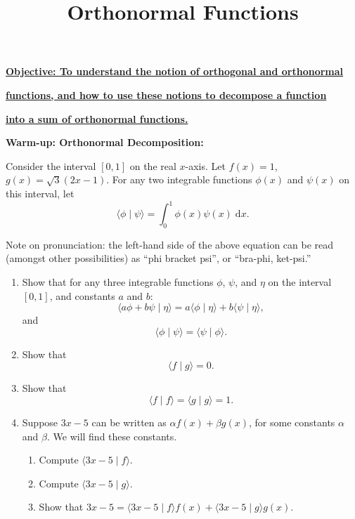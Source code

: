 \documentclass{article}
\newcommand{\diff}{\;\mathrm{d}}
\begin{document}
\title{Orthonormal Functions}
\date{}

\maketitle
\thispagestyle{empty}

\Large

\textbf{\underline{Objective: To understand the notion of orthogonal and orthonormal}}

\textbf{\underline{functions, and how to use these notions to decompose a function}}

\textbf{\underline{into a sum of orthonormal functions.}}






\vspace{5mm}







\textbf{Warm-up: Orthonormal Decomposition:}\bigskip


Consider the interval $[0,1]$ on the real $x$-axis. Let $f(x)=1$, $g(x)=\sqrt{3}(2x-1)$. For any two integrable functions $\phi(x)$ and $\psi(x)$ on this interval, let
\[\langle \phi\mid\psi\rangle = \int_0^1 \phi(x)\psi(x)\diff x.\]

Note on pronunciation: the left-hand side of the above equation can be read (amongst other possibilities) as ``phi bracket psi'', or ``bra-phi, ket-psi.''



\begin{enumerate}
	\item Show that for any three integrable functions $\phi$, $\psi$, and $\eta$ on the interval $[0,1]$, and constants $a$ and $b$:
		\[\langle a\phi+b\psi\mid \eta\rangle = a\langle \phi\mid \eta \rangle + b\langle \psi\mid \eta\rangle,\]
		and
		\[\langle\phi\mid \psi\rangle = \langle \psi\mid\phi\rangle.\]
	\item Show that
		\[\langle f\mid g\rangle = 0.\]
	\item Show that
		\[\langle f\mid f\rangle = \langle g \mid g \rangle = 1.\]
	\item Suppose $3x-5$ can be written as $\alpha f(x)+\beta g(x)$, for some constants $\alpha$ and $\beta$. We will find these constants.
		\begin{enumerate}
			\item Compute $\langle 3x-5\mid f\rangle$.
			\item Compute $\langle 3x-5\mid g\rangle$.
			\item Show that $3x-5 = \langle  3x-5\mid f\rangle f(x) + \langle 3x-5\mid g\rangle g(x)$.
		\end{enumerate}
\end{enumerate}
\end{document}

